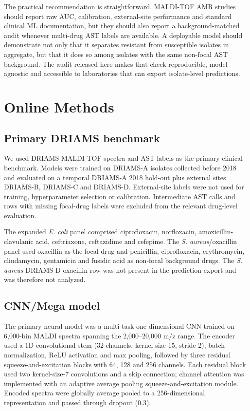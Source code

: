 \documentclass[11pt]{article}
\begin{document}
The practical recommendation is straightforward. MALDI-TOF AMR studies should report raw AUC, calibration, external-site performance and standard clinical ML documentation, but they should also report a background-matched audit whenever multi-drug AST labels are available. A deployable model should demonstrate not only that it separates resistant from susceptible isolates in aggregate, but that it does so among isolates with the same non-focal AST background. The audit released here makes that check reproducible, model-agnostic and accessible to laboratories that can export isolate-level predictions.

\section*{Online Methods}

\subsection*{Primary DRIAMS benchmark}

We used DRIAMS MALDI-TOF spectra and AST labels as the primary clinical benchmark\cite{weis2022driams,driamsdryad}. Models were trained on DRIAMS-A isolates collected before 2018 and evaluated on a temporal DRIAMS-A 2018 hold-out plus external sites DRIAMS-B, DRIAMS-C and DRIAMS-D. External-site labels were not used for training, hyperparameter selection or calibration. Intermediate AST calls and rows with missing focal-drug labels were excluded from the relevant drug-level evaluation.

The expanded \textit{E. coli} panel comprised ciprofloxacin, norfloxacin, amoxicillin-clavulanic acid, ceftriaxone, ceftazidime and cefepime. The \textit{S. aureus}/oxacillin panel used oxacillin as the focal drug and penicillin, ciprofloxacin, erythromycin, clindamycin, gentamicin and fusidic acid as non-focal background drugs. The \textit{S. aureus} DRIAMS-D oxacillin row was not present in the prediction export and was therefore not analyzed.

\subsection*{CNN/Mega model}

The primary neural model was a multi-task one-dimensional CNN trained on 6,000-bin MALDI spectra spanning the 2,000--20,000 m/z range. The encoder used a 1D convolutional stem (32 channels, kernel size 15, stride 2), batch normalization, ReLU activation and max pooling, followed by three residual squeeze-and-excitation blocks with 64, 128 and 256 channels. Each residual block used two kernel-size-7 convolutions and a skip connection; channel attention was implemented with an adaptive average pooling squeeze-and-excitation module. Encoded spectra were globally average pooled to a 256-dimensional representation and passed through dropout (0.3).
\end{document}
